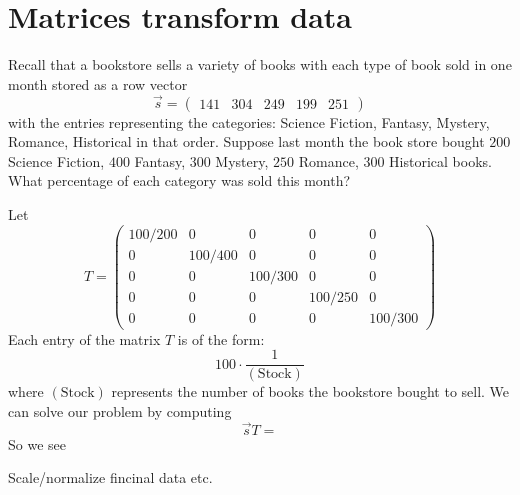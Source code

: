 \documentclass{ximera}
\begin{document}
\section{Matrices transform data}


\begin{example}
  Recall that a bookstore sells a variety of books with each type of
  book sold in one month stored as a row vector
  \[
  \vec{s} = \begin{pmatrix}141 & 304 & 249 & 199 & 251 \end{pmatrix}
  \]
  with the entries representing the categories: Science Fiction,
  Fantasy, Mystery, Romance, Historical in that order.  Suppose last
  month the book store bought $200$ Science Fiction, $400$ Fantasy, $300$
  Mystery, $250$ Romance, $300$ Historical books. What percentage of each
  category was sold this month?
  \begin{explanation}
    Let
    \[
    T =
    \begin{pmatrix}
      100/200 & 0 &    0   &   0    &   0 \\
      0 & 100/400 &    0   &   0    &   0 \\
      0 &   0   &  100/300 &   0    &   0 \\
      0 &   0   &    0   & 100/250  &   0 \\
      0 &   0   &    0   &   0    & 100/300
    \end{pmatrix}
    \]
    Each entry of the matrix $T$ is of the form:
    \[
    100 \cdot \frac{1}{(\text{Stock})}
    \]
    where $(\text{Stock})$ represents the number of books the
    bookstore bought to sell.  We can solve our problem by computing
    \[
    \vec{s} T =
    \]
    So we see
  \end{explanation}

\end{example}




\begin{example}[Navigation]
  Scale/normalize fincinal data etc.
\end{example}
\end{document}
